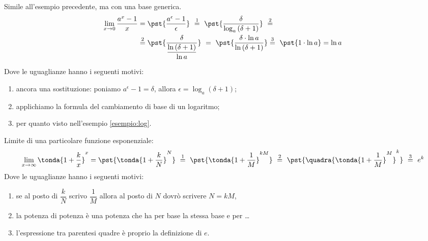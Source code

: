 \begin{esempio}
Simile all'esempio precedente, ma con una base generica.
\begin{align*}
\lim_{x \rightarrow 0} \dfrac{a^x-1}{x} &=
\pst{\dfrac{a^\epsilon-1}{\epsilon}}
~ \stackrel{1}{=} ~  
\pst{\dfrac{\delta}{\log_a{(\delta+1)}}}~ \stackrel{2}{=}\\
&\stackrel{2}{=} 
\pst{\frac{\delta}{\dfrac{\ln{(\delta+1)}}{\ln a}}} ~=~
\pst{\frac{\delta \cdot \ln a}{\ln{(\delta+1)}}} %
\stackrel{3}{=} ~ 
\pst{1 \cdot \ln a}=\ln{a}
\end{align*}

Dove le uguaglianze hanno i seguenti motivi:
\begin{enumerate} [nosep]
 \item ancora una sostituzione: poniamo
\(a^\epsilon-1=\delta\), allora \(\epsilon=\log_a(\delta+1)\);
 \item applichiamo la formula del cambiamento di base di un logaritmo; 
 \item per quanto visto nell'esempio \ref{esempio:log}.
\end{enumerate}
\end{esempio}

\begin{esempio}
Limite di una particolare funzione esponenziale:
\begin{align*}
 \lim_{x \rightarrow \infty} \tonda{1+\dfrac{k}{x}}^x =
 \pst{\tonda{1+\dfrac{k}{N}}^N}
~ \stackrel{1}{=} ~  
\pst{\tonda{1+\dfrac{1}{M}}^{kM}}
~ \stackrel{2}{=} ~
\pst{\quadra{\tonda{1+\dfrac{1}{M}}^M}^k}
~ \stackrel{3}{=} ~ e^k
\end{align*}
Dove le uguaglianze hanno i seguenti motivi:
\begin{enumerate} [nosep]
 \item se al posto di \(\dfrac{k}{N}\) scrivo \(\dfrac{1}{M}\) 
allora al posto di \(N\) dovrò scrivere \(N=kM\), 
 \item la potenza di potenza è una potenza che ha per base la stessa base 
e per \dots
 \item l'espressione tra parentesi quadre è proprio la definizione di \(e\).
\end{enumerate}
\end{esempio}

